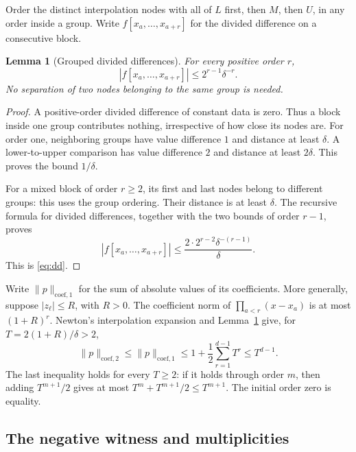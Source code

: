 \documentclass[11pt]{article}
\newtheorem{lemma}[theorem]{Lemma}
\theoremstyle{definition}
\begin{document}
Order the distinct interpolation nodes with all of $L$ first, then $M$, then
$U$, in any order inside a group. Write $f[x_a,\ldots,x_{a+r}]$ for the
divided difference on a consecutive block.

\begin{lemma}[Grouped divided differences]
\label{lem:dd}
For every positive order $r$,
\begin{equation}
 |f[x_a,\ldots,x_{a+r}]|\leq
 2^{r-1}\delta^{-r}.
 \label{eq:dd}
\end{equation}
No separation of two nodes belonging to the same group is needed.
\end{lemma}

\begin{proof}
A positive-order divided difference of constant data is zero. Thus a block
inside one group contributes nothing, irrespective of how close its nodes
are. For order one, neighboring groups have value difference $1$ and
distance at least $\delta$. A lower-to-upper comparison has value difference
$2$ and distance at least $2\delta$. This proves the bound $1/\delta$.

For a mixed block of order $r\geq2$, its first and last nodes belong to
different groups: this uses the group ordering. Their distance is at least
$\delta$. The recursive formula for divided differences, together with the
two bounds of order $r-1$, proves
\[
 |f[x_a,\ldots,x_{a+r}]|
 \leq\frac{2\cdot2^{r-2}\delta^{-(r-1)}}{\delta}.
\]
This is \eqref{eq:dd}.
\end{proof}

Write $\|p\|_{\mathrm{coef},1}$ for the sum of absolute values of its
coefficients. More generally, suppose $|z_\ell|\leq R$, with $R>0$. The
coefficient norm of $\prod_{a<r}(x-x_a)$ is at most $(1+R)^r$. Newton's
interpolation expansion and Lemma~\ref{lem:dd} give, for
$T=2(1+R)/\delta>2$,
\begin{equation}
 \|p\|_{\mathrm{coef},2}
 \leq\|p\|_{\mathrm{coef},1}
 \leq1+\frac12\sum_{r=1}^{d-1}T^r
 \leq T^{d-1}.
 \label{eq:coef}
\end{equation}
The last inequality holds for every $T\geq2$: if it holds through order
$m$, then adding $T^{m+1}/2$ gives at most
$T^m+T^{m+1}/2\leq T^{m+1}$. The initial order zero is equality.

\subsection{The negative witness and multiplicities}
\end{document}
